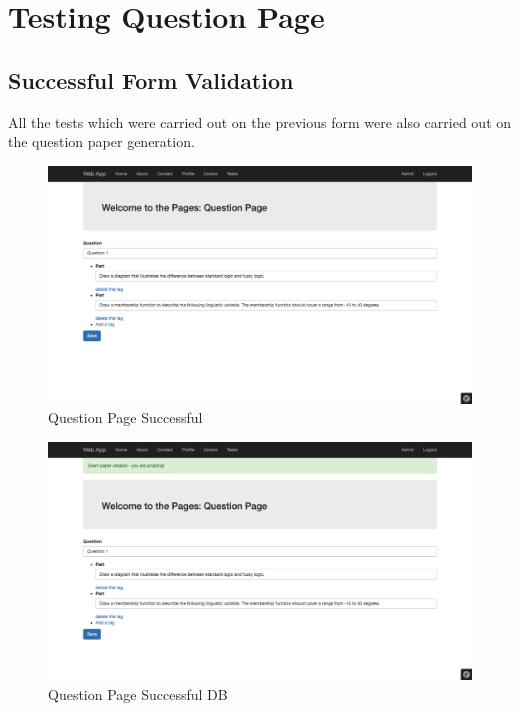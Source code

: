 \section{Testing Question Page}

\subsection{Successful Form Validation}

All the tests which were carried out on the previous form were also carried out on the question paper generation.

\begin{figure}[htbp]
   \centering
   \includegraphics[width=400pt]{figures/tasks_test.png} %
   \caption{Question Page Successful}
   \label{fig:Question Page Successful}
\end{figure}

\begin{figure}[htbp]
   \centering
   \includegraphics[width=400pt]{figures/tasks_success.png} %
   \caption{Question Page Successful DB}
   \label{fig:Question Page Successful DB}
\end{figure}

